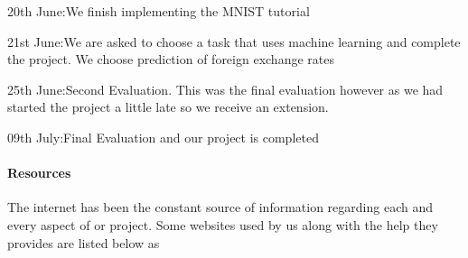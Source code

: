 \documentclass{article}
\begin{document}
20th June:We finish implementing the MNIST tutorial

21st June:We are asked to choose a task that uses machine learning and complete the project. We choose prediction of foreign exchange rates

25th June:Second Evaluation. This was the final evaluation however as we had started the project a little late so we receive an extension.

09th July:Final Evaluation and our project is completed


\newpage
\paragraph{Resources}
The internet has been the constant source of information regarding each and every aspect of or project. Some websites used by us along with the help they provides are listed below as
\end{document}
